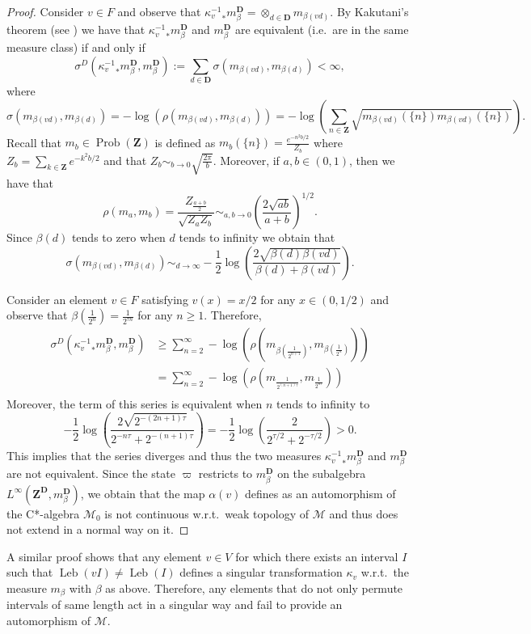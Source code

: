 \documentclass[a4paper,12pt]{amsart}
\numberwithin{equation}{section}
\theoremstyle{definition}
\DeclareMathOperator{\Leb}{Leb}
\newcommand{\D}{\mathbf D}
\newcommand{\scrM}{\mathscr M}
\newcommand{\mbD}{m_\beta^\D}
\newcommand{\ot}{\otimes}\newcommand{\otmin}{\otimes_{\text{min}}}
\DeclareMathOperator{\Prob}{Prob}
\newcommand{\Z}{\mathbf{Z}}
\begin{document}
\begin{proof}
Consider $v\in F$ and observe that ${\kappa_v^{-1}}_*\mbD = \ot_{d\in\D} m_{\beta(vd)}.$
By Kakutani's theorem (see \cite{Kakutani48}) we have that ${\kappa_v^{-1}}_*\mbD$ and $\mbD$ are equivalent (i.e.~are in the same measure class) if and only if $$\sigma^D({\kappa_v^{-1}}_*\mbD , \mbD) := \sum_{d\in \D} \sigma( m_{\beta(vd)} , m_{\beta(d)} ) <\infty,$$
where $$\sigma( m_{\beta(vd)} , m_{\beta(d)} ) = -\log (\rho( m_{\beta(vd)} , m_{\beta(d)} )) = -\log(\sum_{n\in\Z} \sqrt{ m_{ \beta(vd) } ( \{ n \} ) m_{ \beta(vd) } ( \{ n \} ) }).$$
Recall that $m_b\in\Prob(\Z)$ is defined as $m_b(\{n\}) = \tfrac{e^{-n^2 b/2}}{Z_b}$ where $Z_b = \sum_{k\in\Z} e^{-k^2 b/2} $ and that $Z_b\sim_{b\to 0} \sqrt{\tfrac{2\pi}{b}}.$
Moreover, if $a,b\in (0,1)$, then we have that 
$$\rho(m_a,m_b) = \dfrac{Z_{\frac{a+b}{2}}}{\sqrt{Z_aZ_b}} \sim_{a,b\to 0} \left(\dfrac{2\sqrt{ab}}{a+b} \right)^{1/2}.$$
Since $\beta(d)$ tends to zero when $d$ tends to infinity we obtain that 
$$\sigma( m_{\beta(vd)} , m_{\beta(d)} ) \sim_{d\to\infty} -\dfrac{1}{2}\log\left(\dfrac{2\sqrt{\beta(d)\beta(vd)}}{\beta(d)+\beta(vd) }\right).$$

Consider an element $v\in F$ satisfying $v(x)=x/2$ for any $x\in (0,1/2)$ and observe that $\beta(\tfrac{1}{2^n}) = \tfrac{1}{2^{\tau n}}$ for any $n\geq 1.$
Therefore, 
\begin{align*}
\sigma^D({\kappa_v^{-1}}_*\mbD , \mbD) & \geq \sum_{n=2}^\infty  -\log (\rho( m_{\beta(\frac{1}{2^{n+1} } )} , m_{\beta(\frac{1}{2^{n} })} )) \\
& = \sum_{n=2}^\infty  -\log (\rho( m_{\frac{1}{2^{(n+1)\tau} } } , m_{\frac{1}{2^{n \tau} }} ))\\
\end{align*}
Moreover, the term of this series is equivalent when $n$ tends to infinity to 
$$-\dfrac{1}{2}\log\left(\dfrac{2\sqrt{ 2^{-(2n+1)\tau}    } }{ 2^{-n\tau} + 2^{-(n+1)\tau} }\right) = -\dfrac{1}{2} \log\left( \dfrac{2}{2^{\tau/2} +2^{-\tau/2}}\right)>0.$$
This implies that the series diverges and thus the two measures ${\kappa_v^{-1}}_*\mbD$ and $\mbD$ are not equivalent.
Since the state $\varpi$ restricts to $\mbD$ on the subalgebra $L^\infty(\Z^\D,\mbD)$, we obtain that the map $\alpha(v)$ defines as an automorphism of the C*-algebra $\scrM_0$ is not continuous w.r.t.~weak topology of $\scrM$ and thus does not extend in a normal way on it.
\end{proof}

A similar proof shows that any element $v\in V$ for which there exists an interval $I$ such that $\Leb(vI)\neq \Leb(I)$ defines a singular transformation $\kappa_v$ w.r.t.~the measure $m_\beta$ with $\beta$ as above.
Therefore, any elements that do not only permute intervals of same length act in a singular way and fail to provide an automorphism of $\scrM$.
\end{document}

